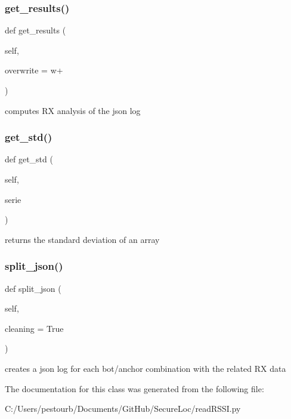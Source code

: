\subsubsection{\texorpdfstring{get\+\_\+results()}{get\_results()}}
{\footnotesize\ttfamily def get\+\_\+results (\begin{DoxyParamCaption}\item[{}]{self,  }\item[{}]{overwrite = {\ttfamily \textquotesingle{}w+\textquotesingle{}} }\end{DoxyParamCaption})}

\begin{DoxyVerb}computes RX analysis of the json log\end{DoxyVerb}
 \mbox{\label{classread_r_s_s_i_1_1_r_s_s_i_a09db525fa9cf4e5f1b3b56e0d35c899e}} 
\subsubsection{\texorpdfstring{get\+\_\+std()}{get\_std()}}
{\footnotesize\ttfamily def get\+\_\+std (\begin{DoxyParamCaption}\item[{}]{self,  }\item[{}]{serie }\end{DoxyParamCaption})}

\begin{DoxyVerb}returns the standard deviation of an array\end{DoxyVerb}
 \mbox{\label{classread_r_s_s_i_1_1_r_s_s_i_a74a17d56ebc1e8701113d8e4abd6b797}} 
\subsubsection{\texorpdfstring{split\+\_\+json()}{split\_json()}}
{\footnotesize\ttfamily def split\+\_\+json (\begin{DoxyParamCaption}\item[{}]{self,  }\item[{}]{cleaning = {\ttfamily True} }\end{DoxyParamCaption})}

\begin{DoxyVerb}creates a json log for each bot/anchor combination with the related RX data\end{DoxyVerb}
 

The documentation for this class was generated from the following file\+:\begin{DoxyCompactItemize}
\item 
C\+:/\+Users/pestourb/\+Documents/\+Git\+Hub/\+Secure\+Loc/read\+R\+S\+S\+I.\+py\end{DoxyCompactItemize}
